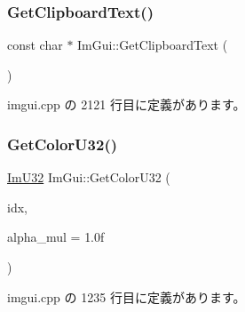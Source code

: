 \subsubsection{\texorpdfstring{Get\+Clipboard\+Text()}{GetClipboardText()}}
{\footnotesize\ttfamily const char $\ast$ Im\+Gui\+::\+Get\+Clipboard\+Text (\begin{DoxyParamCaption}{ }\end{DoxyParamCaption})}



 imgui.\+cpp の 2121 行目に定義があります。

\mbox{\label{namespace_im_gui_a0de2d9bd347d9866511eb8d014e62556}} 
\subsubsection{\texorpdfstring{Get\+Color\+U32()}{GetColorU32()}\hspace{0.1cm}{\footnotesize\ttfamily [1/3]}}
{\footnotesize\ttfamily \mbox{\hyperlink{imgui_8h_a118cff4eeb8d00e7d07ce3d6460eed36}{Im\+U32}} Im\+Gui\+::\+Get\+Color\+U32 (\begin{DoxyParamCaption}\item[{\mbox{\hyperlink{imgui_8h_a1b0467ec582e731ae6292fef726fb5fe}{Im\+Gui\+Col}}}]{idx,  }\item[{float}]{alpha\+\_\+mul = {\ttfamily 1.0f} }\end{DoxyParamCaption})}



 imgui.\+cpp の 1235 行目に定義があります。

